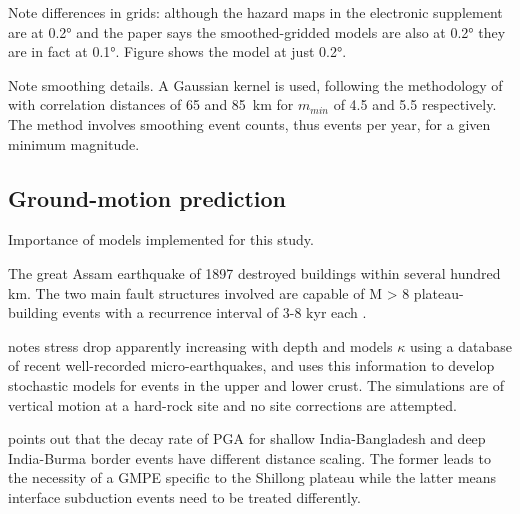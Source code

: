 \documentclass{article}
\begin{document}
Note differences in grids: although the hazard maps in the electronic supplement are at 0.2° and the paper says the smoothed-gridded models are also at 0.2° they are in fact at 0.1°. Figure shows the model at just 0.2°.

Note smoothing details. A Gaussian kernel is used, following the methodology of \cite{frankel1995mapping} with correlation distances of 65 and 85~km for $m_{min}$ of 4.5 and 5.5 respectively. The method involves smoothing event counts, thus events per year, for a given minimum magnitude.

\cite{thingbaijam2011synoptic}

\subsection{Ground-motion prediction}
\label{sec:GroundMotion}

Importance of models implemented for this study. 

The great Assam earthquake of 1897 destroyed buildings within several hundred km. The two main fault structures involved are capable of M > 8 plateau-building events with a recurrence interval of 3-8 kyr each \citep{bilham2001plateau}.

\cite{nath2012ground} notes stress drop apparently increasing with depth and models $\kappa$ using a database of recent well-recorded micro-earthquakes, and uses this information to develop stochastic models for events in the upper and lower crust. The simulations are of vertical motion at a hard-rock site and no site corrections are attempted.

\cite{sharma2009ground} points out that the decay rate of PGA for shallow India-Bangladesh and deep India-Burma border events have different distance scaling. The former leads to the necessity of a GMPE specific to the Shillong plateau \cite{nath2012ground} while the latter means interface subduction events need to be treated differently. 
\end{document}

